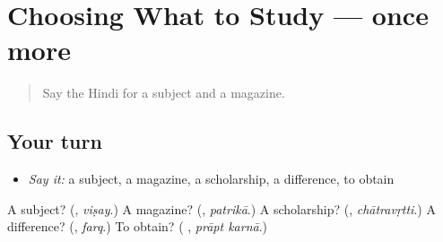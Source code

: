 \section[(dialogue)]{Choosing What to Study — once more}

\label{lesson:HI-R397-review-final-397}



\begin{quote}
Say the Hindi for a subject and a magazine.
\end{quote}

\subsection*{Your turn}
\begin{itemize}
\raggedright
  \item \emph{Say it:} a subject, a magazine, a scholarship, a difference, to obtain
\end{itemize}

\begin{tcolorbox}[breakable,colback=teal!4,colframe=teal!35!black,title={Before you move on}]
A subject? (\textbf{}, \emph{viṣay}.) A magazine? (\textbf{}, \emph{patrikā}.) A scholarship? (\textbf{}, \emph{chātravṛtti}.) A difference? (\textbf{}, \emph{farq}.) To obtain? (\textbf{ }, \emph{prāpt karnā}.)
\end{tcolorbox}
